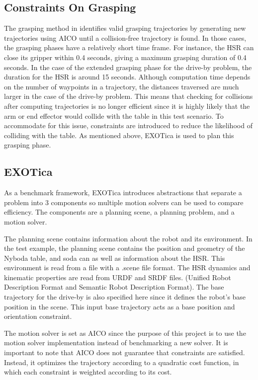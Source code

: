 \documentclass[11pt]{article}
\begin{document}
        \subsection{Constraints On Grasping}
            The grasping method in \cite{yang_planning_2018} identifies valid grasping trajectories by generating new trajectories using AICO until a collision-free trajectory is found. In those cases, the grasping phases have a relatively short time frame. For instance, the HSR can close its gripper within 0.4 seconds, giving a maximum grasping duration of 0.4 seconds. In the case of the extended grasping phase for the drive-by problem, the duration for the HSR is around 15 seconds. Although computation time depends on the number of waypoints in a trajectory, the distances traversed are much larger in the case of the drive-by problem. This means that checking for collisions after computing trajectories is no longer efficient since it is highly likely that the arm or end effector would collide with the table in this test scenario. To accommodate for this issue, constraints are introduced to reduce the likelihood of colliding with the table. As mentioned above, EXOTica is used to plan this grasping phase.

        \subsection{EXOTica}
            As a benchmark framework, EXOTica introduces abstractions that separate a problem into 3 components so multiple motion solvers can be used to compare efficiency.\cite{koubaa_exotica_2019} The components are a planning scene, a planning problem, and a motion solver.
                
            \par The planning scene contains information about the robot and its environment. In the test example, the planning scene contains the position and geometry of the Nyboda table, and soda can as well as information about the HSR. This environment is read from a file with a .scene file format. The HSR dynamics and kinematic properties are read from URDF and SRDF files. (Unified Robot Description Format and Semantic Robot Description Format). The base trajectory for the drive-by is also specified here since it defines the robot's base position in the scene. This input base trajectory acts as a base position and orientation constraint.

            \par The motion solver is set as AICO since the purpose of this project is to use the motion solver implementation instead of benchmarking a new solver. It is important to note that AICO does not guarantee that constraints are satisfied. Instead, it optimizes the trajectory according to a quadratic cost function, in which each constraint is weighted according to its cost.
\end{document}
